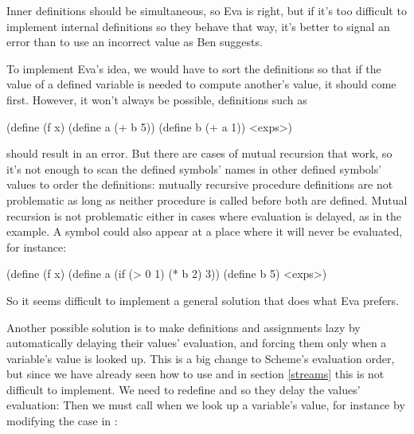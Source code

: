 \begin{exe}[4.19]
    Inner definitions should be simultaneous, so Eva is right, but if it’s too 
    difficult to implement internal definitions so they behave that way, it’s 
    better to signal an error than to use an incorrect value as Ben suggests.

    To implement Eva’s idea, we would have to sort the definitions so that if 
    the value of a defined variable is needed to compute another’s value, it 
    should come first. However, it won’t always be possible, definitions such as
    \begin{cscm}
	(define (f x)
	    (define a (+ b 5))
	    (define b (+ a 1))
	    <exps>)
    \end{cscm}
    should result in an error. But there are cases of mutual recursion that 
    work, so it’s not enough to scan the defined symbols’ names in other defined 
    symbols’ values to order the definitions: mutually recursive procedure 
    definitions are not problematic as long as neither procedure is called 
    before both are defined. Mutual recursion is not problematic either in cases 
    where evaluation is delayed, as in the  example. A symbol could 
    also appear at a place where it will never be evaluated, for instance:
    \begin{cscm}
	(define (f x)
	    (define a (if (> 0 1) (* b 2) 3))
	    (define b 5)
	    <exps>)
    \end{cscm}
    So it seems difficult to implement a general solution that does what Eva 
    prefers.

    \medskip

    Another possible solution is to make definitions and assignments lazy by 
    automatically delaying their values’ evaluation, and forcing them only when 
    a variable’s value is looked up. This is a big change to Scheme’s evaluation 
    order, but since we have already seen how to use  and 
     in section \ref{streams} this is not difficult to implement. We 
    need to redefine  and  so they 
    delay the values’ evaluation:
    Then we must call  when we look up a variable’s value, for 
    instance by modifying the  case in :
\end{exe}

